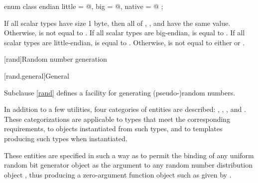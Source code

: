 %
%
%
%
\begin{itemdecl}
enum class endian {
  little = @\seebelow@,
  big    = @\seebelow@,
  native = @\seebelow@
};
\end{itemdecl}

\begin{itemdescr}
\pnum
If all scalar types have size 1 byte, then all of ,
, and  have the same value.
Otherwise,  is not equal to .
If all scalar types are big-endian,  is
equal to .
If all scalar types are little-endian,  is
equal to .
Otherwise,  is not equal
to either  or .
\end{itemdescr}


[rand]{Random number generation}

[rand.general]{General}

%
%
%
%

\pnum
Subclause \ref{rand} defines a facility
for generating (pseudo-)random numbers.

\pnum
In addition to a few utilities,
four categories of entities are described:
,
,
,
and
.
These categorizations are applicable
to types that meet the corresponding requirements,
to objects instantiated from such types,
and to templates producing such types when instantiated.
\begin{note}
 These entities are specified in such a way
 as to permit the binding
 of any uniform random bit generator object 
 as the argument
 to any random number distribution object ,
 thus producing a zero-argument function object
 such as given by
 .
\end{note}

